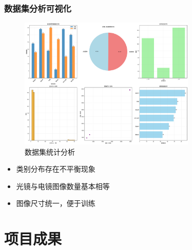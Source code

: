 \documentclass[10pt]{beamer}
\begin{document}
\begin{frame}
\frametitle{数据集分析可视化}
\begin{figure}
\centering
\includegraphics[width=0.75\textwidth]{dataset_analysis.png}
\caption{数据集统计分析}
\end{figure}

\begin{itemize}
    \item 类别分布存在不平衡现象
    \item 光镜与电镜图像数量基本相等
    \item 图像尺寸统一，便于训练
\end{itemize}
\end{frame}

\section{项目成果}
\end{document}
